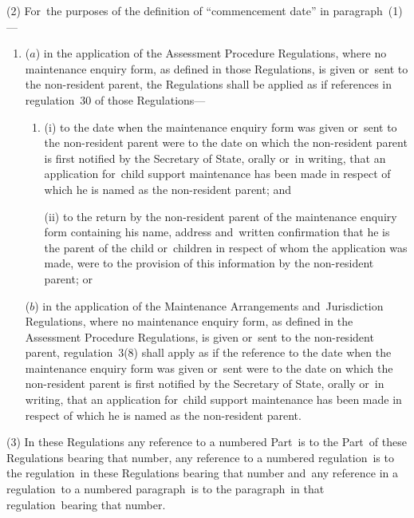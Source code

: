 \documentclass[12pt,a4paper]{article}
\begin{document}
(2) For~the purposes of the definition of “commencement date” in paragraph~(1)—
\begin{enumerate}\item[]
($a$) in the application of the Assessment Procedure Regulations, where no maintenance enquiry form, as defined in those Regulations, is given or~sent to the non-resident parent, the Regulations shall be applied as if references in regulation~30 of those Regulations—
\begin{enumerate}\item[]
(i) to the date when the maintenance enquiry form was given or~sent to the non-resident parent were to the date on which the non-resident parent is first notified by the Secretary of State, orally or~in writing, that an application for~child support maintenance has been made in respect of which he is named as the non-resident parent; and

(ii) to the return by the non-resident parent of the maintenance enquiry form containing his name, address and~written confirmation that he is the parent of the child or~children in respect of whom the application was made, were to the provision of this information by the non-resident parent; or
\end{enumerate}

($b$) in the application of the Maintenance Arrangements and~Jurisdiction Regulations, where no maintenance enquiry form, as defined in the Assessment Procedure Regulations, is given or~sent to the non-resident parent, regulation~3(8) shall apply as if the reference to the date when the maintenance enquiry form was given or~sent were to the date on which the non-resident parent is first notified by the Secretary of State, orally or~in writing, that an application for~child support maintenance has been made in respect of which he is named as the non-resident parent.
\end{enumerate}

(3) In these Regulations any reference to a numbered Part~is to the Part~of these Regulations bearing that number, any reference to a numbered regulation~is to the regulation~in these Regulations bearing that number and~any reference in a regulation~to a numbered paragraph~is to the paragraph~in that regulation~bearing that number.

\end{document}

